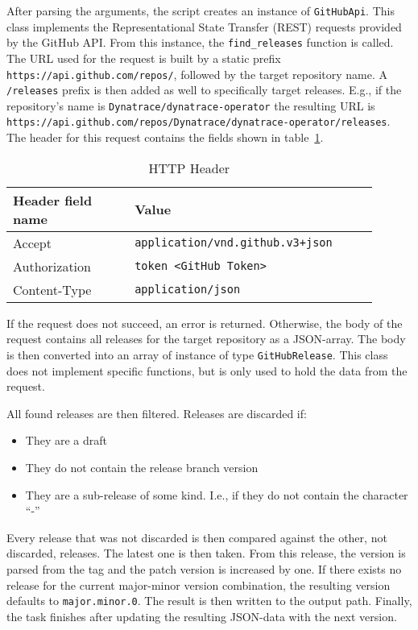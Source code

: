 \pagebreak

After parsing the arguments, the script creates an instance of \verb|GitHubApi|.
This class implements the Representational State Transfer (REST) requests provided by the GitHub API.
From this instance, the \verb|find_releases| function is called.
The URL used for the request is built by a static prefix \verb|https://api.github.com/repos/|, followed by the target repository name.
A \verb|/releases| prefix is then added as well to specifically target releases.
E.g., if the repository's name is \verb|Dynatrace/dynatrace-operator| the resulting URL is \verb|https://api.github.com/repos/Dynatrace/dynatrace-operator/releases|.
The header for this request contains the fields shown in table~\ref{tab:http-header}.

\begin{table}[H]
    \centering
    \caption{HTTP Header}
    \label{tab:http-header}
    \begin{tabular}{p{0.3\linewidth}|p{0.6\linewidth}}
        Header field name & Value \\
        \hline
        Accept & \verb|application/vnd.github.v3+json| \\
        Authorization & \verb|token <GitHub Token>| \\
        Content-Type & \verb|application/json| \\
    \end{tabular}
\end{table}

If the request does not succeed, an error is returned.
Otherwise, the body of the request contains all releases for the target repository as a JSON-array.
The body is then converted into an array of instance of type \verb|GitHubRelease|.
This class does not implement specific functions, but is only used to hold the data from the request.

All found releases are then filtered.
Releases are discarded if:
\begin{itemize}
    \item They are a draft
    \item They do not contain the release branch version
    \item They are a sub-release of some kind.
        I.e., if they do not contain the character ``-''
\end{itemize}

Every release that was not discarded is then compared against the other, not discarded, releases.
The latest one is then taken.
From this release, the version is parsed from the tag and the patch version is increased by one.
If there exists no release for the current major-minor version combination, the resulting version defaults to \verb|major.minor.0|.
The result is then written to the output path.
Finally, the task finishes after updating the resulting JSON-data with the next version.
